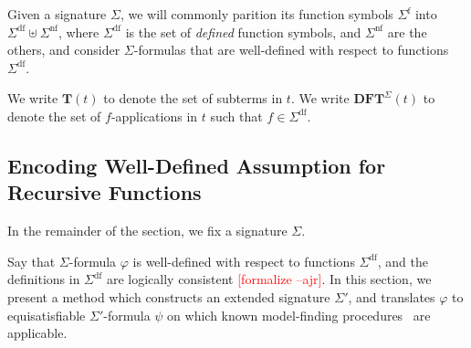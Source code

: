 \documentclass[runningheads,a4paper]{llncs}
\newcommand{\terms}{\mathbf{T}}
\newcommand{\functerms}{\mathbf{DFT}}
\newcommand{\sfuns}[1]{#1^\mathrm{f}}
\newcommand{\sfundefs}[1]{#1^\mathrm{df}}
\newcommand{\sfunndefs}[1]{#1^\mathrm{nf}}
\newcommand{\rem}[1]{\textcolor{red}{[#1]}}
\newcommand{\ajr}[1]{\rem{#1 --ajr}}
\begin{document}
Given a signature $\Sigma$, 
we will commonly parition its function symbols $\sfuns{\Sigma}$ into $\sfundefs{\Sigma} \mathrel{\uplus} \sfunndefs{\Sigma}$,
where $\sfundefs{\Sigma}$ is the set of \emph{defined} function symbols,
and $\sfunndefs{\Sigma}$ are the others,
and consider $\Sigma$-formulas that are well-defined with respect to functions $\sfundefs{\Sigma}$.

We write $\terms( t )$ to denote the set of subterms in $t$.
We write $\functerms^\Sigma( t )$ to denote the set of $f$-applications in $t$ such that $f \in \sfundefs{\Sigma}$.

\subsection{Encoding Well-Defined Assumption for Recursive Functions}
\label{sec:encoding}

In the remainder of the section, we fix a signature $\Sigma$.


Say that $\Sigma$-formula $\varphi$ is well-defined with respect to functions $\sfundefs{\Sigma}$,
and the definitions in $\sfundefs{\Sigma}$ are logically consistent \ajr{formalize}.
In this section, we present a method which constructs an extended signature $\Sigma'$,
and translates $\varphi$ to equisatisfiable $\Sigma'$-formula $\psi$ on which known model-finding procedures~\cite{GeDeM-CAV-09, ReyEtAl-1-RR-13} are applicable.
\end{document}

